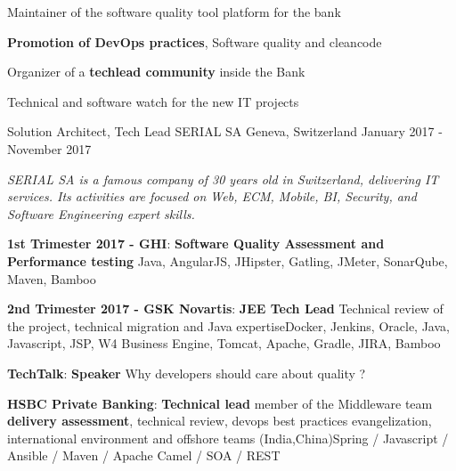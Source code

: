 \begin{cventries}
{\begin{cvitems}
            \item {Maintainer of the software quality tool platform for the bank}
            \item {\textbf{Promotion of DevOps practices}, Software quality and cleancode}
            \item {Organizer of a \textbf{techlead community }inside the Bank}
            \item {Technical and software watch for the new IT projects}
        \end{cvitems}
    }
    \cventry
    {Solution Architect, Tech Lead} %
    {SERIAL SA} %
    {Geneva, Switzerland} %
    {January 2017 - November 2017} %
    {
        \begin{cvitems} %
            \item {\textit{SERIAL SA is a famous company of 30 years old in Switzerland, delivering IT services. Its activities are focused on Web, ECM, Mobile, BI, Security, and Software Engineering expert skills.}}
            \item { \textbf{1st Trimester 2017 - GHI}: \textbf{Software Quality Assessment and Performance testing} \newline Java, AngularJS, JHipster, Gatling, JMeter, SonarQube, Maven, Bamboo}
            \item { \textbf{2nd Trimester 2017 - GSK Novartis}: \textbf{JEE Tech Lead} \newline Technical review of the project, technical migration and Java expertise\newline Docker, Jenkins, Oracle, Java, Javascript, JSP, W4 Business Engine, Tomcat, Apache, Gradle, JIRA, Bamboo}
            \item { \textbf{TechTalk}: \textbf{Speaker} \newline Why developers should care about quality ?}
            \item { \textbf{HSBC Private Banking}: \textbf{Technical lead} \newline member of the Middleware team  \textbf{delivery assessment}, technical review, devops best practices evangelization, international environment and offshore teams (India,China)\newline Spring / Javascript / Ansible / Maven / Apache Camel / SOA / REST}
        \end{cvitems}
    }


\end{cventries}
